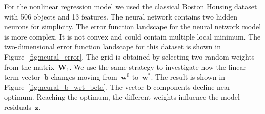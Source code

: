 \documentclass[a4paper,12pt]{article}
\theoremstyle{plain} %
\theoremstyle{definition} %
\theoremstyle{remark} %
\newcommand{\bb}{\mathbf{b}}
\newcommand{\bw}{\mathbf{w}}
\newcommand{\bz}{\mathbf{z}}
\newcommand{\bW}{\mathbf{W}}
\begin{document}
  	For the nonlinear regression model we used the classical Boston Housing dataset with 506 objects and 13 features.
  	The neural network contains two hidden neurons for simplicity.
  	The error function landscape for the neural network model is more complex. 
  	It is not convex and could contain multiple local minimum.
  	The two-dimensional error function landscape for this dataset is shown in Figure~\ref{fig:neural_error}. 
  	The grid is obtained by selecting two random weights from the matrix~$\bW_1$.
  	We use the same strategy to investigate how the linear term vector~$\bb$ changes moving from~$\bw^0$ to~$\bw^*$. 
  	The result is shown in Figure~\ref{fig:neural_b_wrt_beta}.
  	The vector $\bb$ components decline near optimum. 
  	Reaching the optimum, the different weights influence the model residuals~$\bz$.
  
\end{document}
